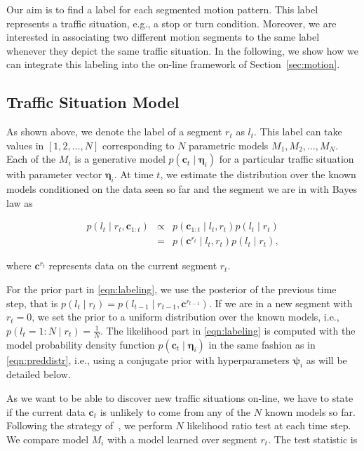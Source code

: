 Our aim is to find a label for each segmented motion pattern. This label
represents a traffic situation, e.g., a stop or turn condition. Moreover, we are
interested in associating two different motion segments to the same label
whenever they depict the same traffic situation. In the following, we show how
we can integrate this labeling into the on-line framework of
Section~\ref{sec:motion}.

\subsection{Traffic Situation Model}
As shown above, we denote the label of a segment $r_t$ as $l_t$. This label can
take values in $[1,2,\dots,N]$ corresponding to $N$ parametric models $M_1,M_2,
\dots,M_N$. Each of the $M_i$ is a generative model $p(\mathbf{c}_t\mid
\boldsymbol{\eta}_i)$ for a particular traffic situation with parameter vector
$\boldsymbol{\eta}_i$. At time $t$, we estimate the distribution over the known
models conditioned on the data seen so far and the segment we are in with Bayes
law as

\begin{eqnarray}
\label{eqn:labeling}
p(l_t\mid r_t,\mathbf{c}_{1:t})&\propto&p(\mathbf{c}_{1:t}\mid l_t,r_t)
p(l_t\mid r_t)\nonumber\\
&=& p(\mathbf{c}^{r_t}\mid l_t,r_t)p(l_t\mid r_t),
\end{eqnarray}

where $\mathbf{c}^{r_t}$ represents data on the current segment $r_t$.

For the prior part in \eqref{eqn:labeling}, we use the posterior of the previous
time step, that is
$p(l_t\mid r_t)=p(l_{t-1}\mid r_{t-1},\mathbf{c}^{r_{t-1}})$. If we are in a new
segment with $r_t=0$, we set the prior to a uniform distribution over the known
models, i.e., $p(l_t=1:N\mid r_t)=\frac{1}{N}$. The likelihood part in
\eqref{eqn:labeling} is computed with the model probability density function
$p(\mathbf{c}_t\mid \boldsymbol{\eta}_i)$ in the same fashion as in
\eqref{eqn:preddistr}, i.e., using a conjugate prior with hyperparameters
$\boldsymbol{\psi}_i$ as will be detailed below.

As we want to be able to discover new traffic situations on-line, we have to
state if the current data $\mathbf{c}_t$ is unlikely to come from any of the
$N$ known models so far. Following the strategy of~\cite{ranganathan10pliss},
we perform $N$ likelihood ratio test at each time step. We compare model $M_i$
with a model learned over segment $r_t$. The test statistic is

